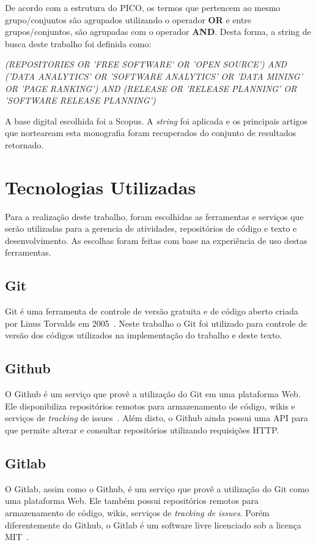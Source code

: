 De acordo com a estrutura do PICO, os termos que pertencem ao mesmo grupo/conjuntos são agrupados utilizando o operador \textbf{OR} e entre grupos/conjuntos, são agrupadas com o operador \textbf{AND}. Desta forma, a string de busca deste trabalho foi definida como:

\begin{center}
        \textit{(REPOSITORIES OR 'FREE SOFTWARE' OR 'OPEN SOURCE') AND ('DATA ANALYTICS' OR 'SOFTWARE ANALYTICS' OR 'DATA MINING' OR 'PAGE RANKING') AND (RELEASE OR 'RELEASE PLANNING' OR 'SOFTWARE RELEASE PLANNING')}
\end{center}

A base digital escolhida foi a Scopus. A \textit{string} foi aplicada e os principais artigos que norteaream esta monografia foram recuperados do conjunto de resultados retornado.

\section{Tecnologias Utilizadas}
\label{met:tec}
Para a realização deste trabalho, foram escolhidas as ferramentas e serviços que serão utilizadas para a gerencia de atividades, repositórios de código e texto e desenvolvimento. As escolhas foram feitas com base na experiência de uso destas ferramentas.

\subsection{Git}
\label{met:tec:git}
Git é uma ferramenta de controle de versão gratuita e de código aberto criada por Linus Torvalds em 2005~\cite{chacon}. Neste trabalho o Git foi utilizado para controle de versão dos códigos utilizados na implementação do trabalho e deste texto.

\subsection{Github}
\label{met:tec:github}
O Github é um serviço que provê a utilização do Git em uma plataforma Web. Ele disponibiliza repositórios remotos para armazenamento de código, wikis e serviços de \textit{tracking} de issues~\cite{github}. Além disto, o Github ainda possui uma API para que permite alterar e consultar repositórios utilizando requisições HTTP.

\subsection{Gitlab}
\label{met:tec:gitlab}
O Gitlab, assim como o Github, é um serviço que provê a utilização do Git como uma plataforma Web. Ele também possui repositórios remotos para armazenamento de código, wikis, serviços de \textit{tracking de issues}. Porém diferentemente do Github, o Gitlab é um software livre licenciado sob a licença MIT~\cite{gitlab}.

